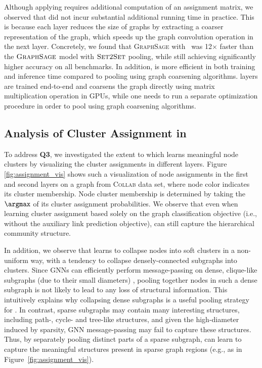  Although applying \name requires additional computation of an assignment matrix, we observed that \name did not incur substantial additional running time in practice.
This is because each \name layer reduces the size of graphs by extracting a coarser representation of the graph, which speeds up the graph convolution operation in the next layer.
Concretely, we found that \textsc{GraphSage} with \name\ was 12$\times$ faster than the $\textsc{GraphSage}$ model with $\textsc{Set2Set}$ pooling, while still achieving significantly higher accuracy on all benchmarks. 
In addition, \name is more efficient in both training and inference time compared to pooling using graph coarsening algorithms. \name layers are trained end-to-end and coarsens the graph directly using matrix multiplication operation in GPUs, while one needs to run a separate optimization procedure in order to pool using graph coarsening algorithms. 

\subsection{Analysis of Cluster Assignment in \name}
\label{sec:assignment_vis}

To address {\bf Q3}, we investigated the extent to which \name learns meaningful node clusters by visualizing the cluster assignments in different layers. Figure \ref{fig:assignment_vis} shows such a visualization of node assignments in the first and second layers on a graph from \textsc{Collab} data set, where node color indicates its cluster membership. Node cluster membership is determined by taking the $\argmax$ of its cluster assignment probabilities. We observe that even when learning cluster assignment based solely on the graph classification objective (i.e., without the auxiliary link prediction objective), \name can still capture the hierarchical community structure.

In addition, we observe that \name learns to collapse nodes into soft clusters in a non-uniform way, with a tendency to collapse densely-connected subgraphs into clusters. 
Since GNNs can efficiently perform message-passing on dense, clique-like subgraphs (due to their small diameters) \cite{liao2018graph}, pooling together nodes in such a dense subgraph is not likely to lead to any loss of structural information. 
This intuitively explains why collapsing dense subgraphs is a useful pooling strategy for \name. 
In contrast, sparse subgraphs may contain many interesting structures, including path-, cycle- and tree-like structures, and given the high-diameter induced by sparsity, GNN message-passing may fail to capture these structures. 
Thus, by separately pooling distinct parts of a sparse subgraph, \name can learn to capture the meaningful structures present in sparse graph regions (e.g., as in Figure~\ref{fig:assignment_vis}). 



